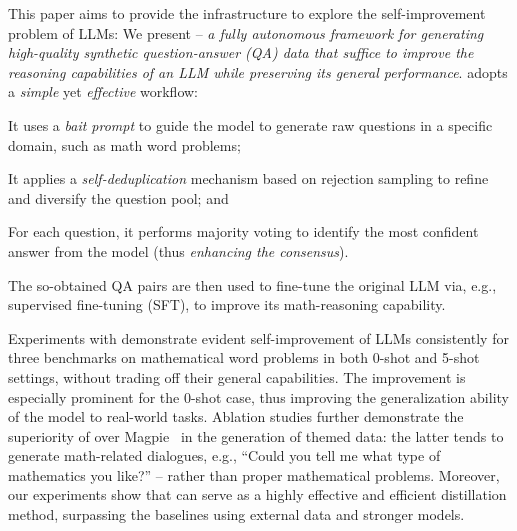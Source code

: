 This paper aims to provide the infrastructure to explore the self-improvement problem of LLMs:
We present {\langname} -- \emph{a fully autonomous framework for generating high-quality synthetic question-answer (QA) data that suffice to improve the reasoning capabilities of an LLM while preserving its general performance}.
{\langname} adopts a \emph{simple} yet \emph{effective} workflow:
\begin{enumerate*}[label=(\roman*)]
    \item It uses a \emph{bait prompt} to guide the model to generate raw questions in a specific domain, such as math word problems;
    \item It applies a \emph{self-deduplication} mechanism based on rejection sampling \cite{liu2001monte} to refine and diversify the question pool; and
    \item For each question, it performs majority voting \cite{DBLP:conf/iclr/0002WSLCNCZ23} to identify the most confident answer from the model (thus \emph{enhancing the consensus}).
\end{enumerate*}
The so-obtained QA pairs are then used to fine-tune the original LLM via, e.g., supervised fine-tuning (SFT), to improve its math-reasoning capability.

Experiments with {\langname} demonstrate evident self-improvement of LLMs consistently for three benchmarks on mathematical word problems in both 0-shot and 5-shot settings, without trading off their general capabilities. %
The improvement is especially prominent for the 0-shot case, thus improving the generalization ability of the model to real-world tasks. 
Ablation studies further demonstrate the superiority of {\langname} over Magpie~\cite{DBLP:journals/corr/abs-2406-08464} in the generation of themed data: the latter tends to generate math-related dialogues, e.g., \enquote{Could you tell me what type of mathematics you like?} -- rather than proper mathematical problems. 
Moreover, our experiments show that {\langname} can serve as a highly effective and efficient distillation method, surpassing the baselines using external data and stronger models.

